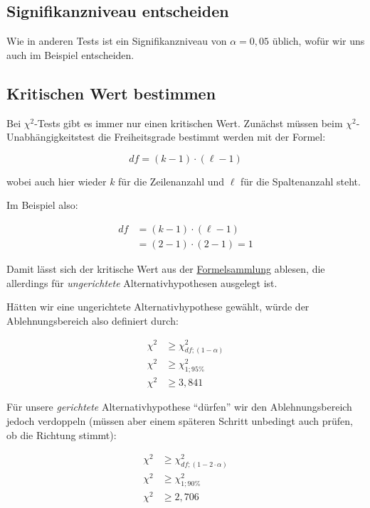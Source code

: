 \documentclass[
  11pt,
  ngerman,
  a4paper,
]{report}
\begin{document}
\hypertarget{signifikanzniveau-entscheiden-4}{%
\subsection{Signifikanzniveau entscheiden}\label{signifikanzniveau-entscheiden-4}}

Wie in anderen Tests ist ein Signifikanzniveau von \(\alpha=0{,}05\) üblich, wofür wir uns auch im Beispiel entscheiden.

\hypertarget{kritischen-wert-bestimmen}{%
\subsection{Kritischen Wert bestimmen}\label{kritischen-wert-bestimmen}}

Bei \(\chi^2\)-Tests gibt es immer nur einen kritischen Wert. Zunächst müssen beim \(\chi^2\)-Unabhängigkeitstest die Freiheitsgrade bestimmt werden mit der Formel:

\[
\mathit{df} = (k - 1) \cdot (\ell - 1)
\label{eq:dfu}
\]

wobei auch hier wieder \(k\) für die Zeilenanzahl und \(\ell\) für die Spaltenanzahl steht.

Im Beispiel also:

\[
\begin{aligned}
\mathit{df} &= (k - 1) \cdot (\ell - 1)\\
&=(2-1)\cdot (2 - 1) = 1
\end{aligned}
\]

Damit lässt sich der kritische Wert aus der \protect\hyperlink{formeln}{Formelsammlung} ablesen, die allerdings für \emph{ungerichtete} Alternativhypothesen ausgelegt ist.

Hätten wir eine ungerichtete Alternativhypothese gewählt, würde der Ablehnungsbereich also definiert durch:

\[
\begin{aligned}
\chi^2 &\geq \chi^2_{df;(1-\alpha)}\\
\chi^2 &\geq \chi^2_{1;95\%}\\
\chi^2 &\geq 3{,}841
\end{aligned}
 \]

Für unsere \emph{gerichtete} Alternativhypothese \enquote{dürfen} wir den Ablehnungsbereich jedoch verdoppeln (müssen aber einem späteren Schritt unbedingt auch prüfen, ob die Richtung stimmt):

\[
\begin{aligned}
\chi^2 &\geq \chi^2_{df;(1-2\cdot\alpha)}\\
\chi^2 &\geq \chi^2_{1;90\%}\\
\chi^2 &\geq 2{,}706
\end{aligned}
\]
\end{document}

